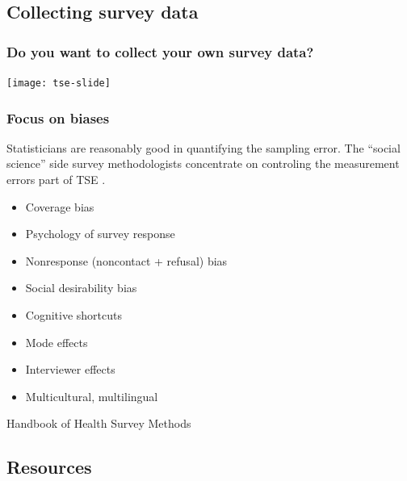 \documentclass{beamer}
\begin{document}
\subsection{Collecting survey data}

\begin{frame}\frametitle{Do you want to collect your own survey data?}

\centering

\texttt{[image: tse-slide]}

\end{frame}

\begin{frame}\frametitle{Focus on biases}

Statisticians are reasonably good in quantifying the sampling error. 
The ``social science'' side survey methodologists concentrate on controling 
the measurement errors part of TSE
\citep{grov:fowl:coup:lepk:sing:tour:2009,groves:lyberg:2010}.

\begin{itemize}
    \item Coverage bias
    \item Psychology of survey response
    \item Nonresponse (noncontact + refusal) bias
    \item Social desirability bias
    \item Cognitive shortcuts
    \item Mode effects
    \item Interviewer effects
    \item Multicultural, multilingual
\end{itemize}

Handbook of Health Survey Methods \citep{johnson:2015:handbook}

\end{frame}

\subsection{Resources}
\end{document}
